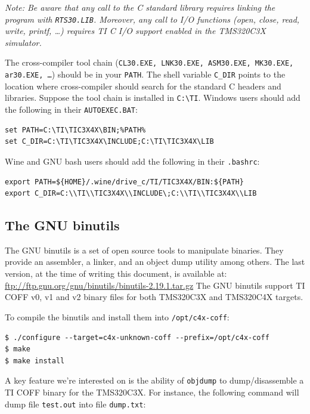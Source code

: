 \textit{Note: Be aware that any call to the C standard library requires linking the program with \texttt{RTS30.LIB}.
Moreover, any call to I/O functions (open, close, read, write, printf, \ldots) requires TI C I/O support enabled in the TMS320C3X simulator.}

The cross-compiler tool chain (\texttt{CL30.EXE, LNK30.EXE, ASM30.EXE, MK30.EXE, ar30.EXE, \ldots}) should be in your \texttt{PATH}.
The shell variable \texttt{C\_DIR} points to the location where cross-compiler should search for the standard C headers and libraries.
Suppose the tool chain is installed in \texttt{C:{\textbackslash}TI}.
Windows users should add the following in their \texttt{AUTOEXEC.BAT}:
\begin{verbatim}
set PATH=C:\TI\TIC3X4X\BIN;%PATH%
set C_DIR=C:\TI\TIC3X4X\INCLUDE;C:\TI\TIC3X4X\LIB
\end{verbatim}
Wine and GNU bash users should add the following in their \texttt{.bashrc}:
\begin{verbatim}
export PATH=${HOME}/.wine/drive_c/TI/TIC3X4X/BIN:${PATH}
export C_DIR=C:\\TI\\TIC3X4X\\INCLUDE\;C:\\TI\\TIC3X4X\\LIB
\end{verbatim}

\subsection{The GNU binutils}

The GNU binutils is a set of open source tools to manipulate binaries. They provide an assembler, a linker, and an object dump utility among others.
The last version, at the time of writing this document, is available at: \url{ftp://ftp.gnu.org/gnu/binutils/binutils-2.19.1.tar.gz}
The GNU binutils support TI COFF v0, v1 and v2 binary files for both TMS320C3X and TMS320C4X targets.

To compile the binutils and install them into \texttt{/opt/c4x-coff}:

\begin{verbatim}
$ ./configure --target=c4x-unknown-coff --prefix=/opt/c4x-coff
$ make
$ make install
\end{verbatim}

A key feature we're interested on is the ability of \texttt{objdump} to dump/disassemble a TI COFF binary for the TMS320C3X.
For instance, the following command will dump file \texttt{test.out} into file \texttt{dump.txt}:

